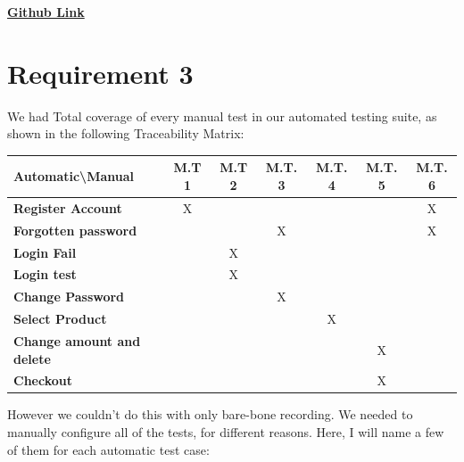 \documentclass[UKenglish,12pt]{article}
\begin{document}
\vspace{0.5cm}
\href{https://github.com/sebasso/INF4121-Project2}{\textbf{\Large{Github Link}}}


\section{Requirement 3}
We had Total coverage of every manual test in our automated testing suite, as shown in the following Traceability Matrix:
\begin{table}[!htbp]
	\small
	\begin{tabular}{| l | c | c | c | c | c | c |}
		\hline
		\textbf{Automatic\textbackslash Manual} & M.T 1 & M.T 2 & M.T. 3 & M.T. 4 & M.T. 5 & M.T. 6 \\ \hline
		\textbf{Register Account} & X & & & & & X \\ \hline
		\textbf{Forgotten password} & & & X & & & X \\ \hline
		\textbf{Login Fail} & & X & & & & \\ \hline
		\textbf{Login test} & & X & & & & \\ \hline
		\textbf{Change Password} & & & X & & & \\ \hline
		\textbf{Select Product} & & & & X & & \\ \hline
		\textbf{Change amount and delete} & & & & & X & \\ \hline
		\textbf{Checkout} & & & & & X & \\ \hline
		\hline
	\end{tabular} %
\end{table}
\newline
 However we couldn't do this with only bare-bone recording. We needed to manually configure all of the tests, for different reasons. Here, I will name a few of them for each automatic test case:
\end{document}

